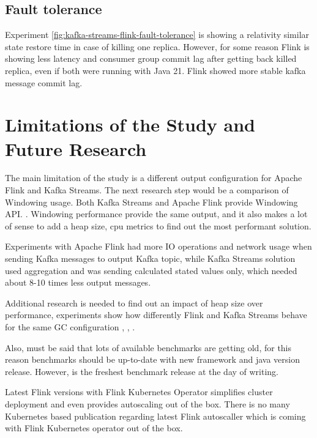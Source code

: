 \subsection{Fault tolerance}\label{subsec:fault-tolerance}
Experiment \ref{fig:kafka-streams-flink-fault-tolerance} is showing a
relativity similar state restore time in case of killing one replica.
However, for some reason Flink is showing less latency and
consumer group commit lag after getting back killed replica, even
if both were running with Java 21.
Flink showed more stable kafka message commit lag.

\section{Limitations of the Study and Future Research}\label{sec:limitations-of-the-study}
The main limitation of the study is a different output configuration for
Apache Flink and Kafka Streams.
The next research step would be a comparison of Windowing usage.
Both Kafka Streams and Apache Flink provide Windowing API. \cite{flink_windows, kafka_streams_windows}.
Windowing performance provide the same output, and it also makes a lot of sense to
add a heap size, cpu metrics to find out the most performant solution.

Experiments with Apache Flink had more IO operations and network usage when sending Kafka messages
to output Kafka topic, while Kafka Streams solution used aggregation and was sending
calculated stated values only, which needed about 8-10 times less output messages.

Additional research is needed to find out an impact of heap size over performance,
experiments show how differently Flink and Kafka Streams behave for the same GC
configuration \cite{java_21_new_gc}, \cite{gencer2021hazelcast}, \cite{hazelcase_gc_concerns}.

Also, must be said that lots of available benchmarks are getting old, for this
reason benchmarks should be up-to-date with new framework and java version release.
However, \cite{ICPE2024} is the freshest benchmark release at the day of writing.

Latest Flink versions with Flink Kubernetes Operator \cite{flink_kubernetes_operator}
simplifies cluster deployment and even provides autoscaling out of the box.
There is no many Kubernetes based publication regarding latest Flink autoscaller
which is coming with Flink Kubernetes operator out of the box.